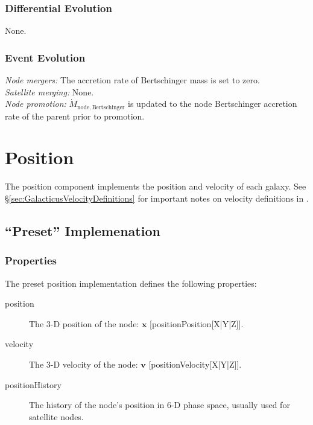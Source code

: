 \subsubsection{Differential Evolution}

None.

\subsubsection{Event Evolution}

\noindent\emph{Node mergers:} The accretion rate of Bertschinger mass is set to zero.\\

\noindent\emph{Satellite merging:} None.\\

\noindent\emph{Node promotion:} $\dot{M}_\mathrm{node, Bertschinger}$ is updated to the \gls{node} Bertschinger accretion rate of the parent prior to promotion.\\

\section{Position}\label{sec:ComponentPosition}

The position \gls{component} implements the position and velocity of each galaxy. See \S\ref{sec:GalacticusVelocityDefinitions} for important notes on velocity definitions in \glc.

\subsection{``Preset'' Implemenation}

\subsubsection{Properties}

The preset position implementation defines the following properties:
\begin{description}
 \item [{\normalfont \ttfamily position}] The 3-D position of the node: $\mathbf{x}$ [{\normalfont \ttfamily positionPosition[X|Y|Z]}].
 \item [{\normalfont \ttfamily velocity}] The 3-D velocity of the node: $\mathbf{v}$ [{\normalfont \ttfamily positionVelocity[X|Y|Z]}].
 \item [{\normalfont \ttfamily positionHistory}] The history of the node's position in 6-D phase space, usually used for satellite nodes.
\end{description}

